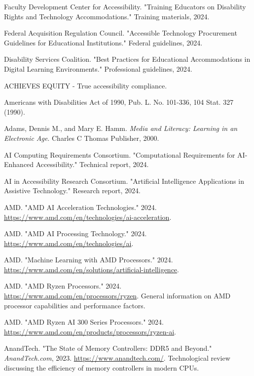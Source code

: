 \begin{thebibliography}{99}
Faculty Development Center for Accessibility. "Training Educators on Disability Rights and Technology Accommodations." Training materials, 2024.

Federal Acquisition Regulation Council. "Accessible Technology Procurement Guidelines for Educational Institutions." Federal guidelines, 2024.

Disability Services Coalition. "Best Practices for Educational Accommodations in Digital Learning Environments." Professional guidelines, 2024.

ACHIEVES EQUITY - True accessibility compliance.

Americans with Disabilities Act of 1990, Pub. L. No. 101-336, 104 Stat. 327 (1990).

Adams, Dennis M., and Mary E. Hamm. \emph{Media and Literacy: Learning in an Electronic Age}. Charles C Thomas Publisher, 2000.

AI Computing Requirements Consortium. "Computational Requirements for AI-Enhanced Accessibility." Technical report, 2024.

AI in Accessibility Research Consortium. "Artificial Intelligence Applications in Assistive Technology." Research report, 2024.

AMD. "AMD AI Acceleration Technologies." 2024. \url{https://www.amd.com/en/technologies/ai-acceleration}.

AMD. "AMD AI Processing Technology." 2024. \url{https://www.amd.com/en/technologies/ai}.

AMD. "Machine Learning with AMD Processors." 2024. \url{https://www.amd.com/en/solutions/artificial-intelligence}.

AMD. "AMD Ryzen Processors." 2024. \url{https://www.amd.com/en/processors/ryzen}. General information on AMD processor capabilities and performance factors.

AMD. "AMD Ryzen AI 300 Series Processors." 2024. \url{https://www.amd.com/en/products/processors/ryzen-ai}.

AnandTech. "The State of Memory Controllers: DDR5 and Beyond." \emph{AnandTech.com}, 2023. \url{https://www.anandtech.com/}. Technological review discussing the efficiency of memory controllers in modern CPUs.


\end{thebibliography}
